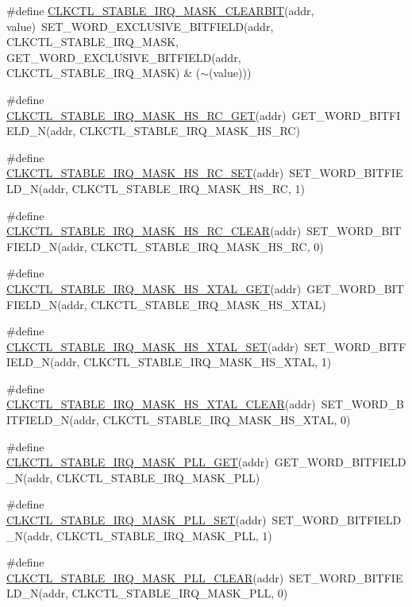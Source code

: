 \begin{DoxyCompactItemize}
\#define \hyperlink{a00544_a5a3fa9a6a8af8000278f7157d2a208f8}{CLKCTL\_\-STABLE\_\-IRQ\_\-MASK\_\-CLEARBIT}(addr, value)~SET\_\-WORD\_\-EXCLUSIVE\_\-BITFIELD(addr, CLKCTL\_\-STABLE\_\-IRQ\_\-MASK, GET\_\-WORD\_\-EXCLUSIVE\_\-BITFIELD(addr, CLKCTL\_\-STABLE\_\-IRQ\_\-MASK) \& ($\sim$(value)))
\item 
\#define \hyperlink{a00544_ad8c6920881a257497ed76a1f49bc9694}{CLKCTL\_\-STABLE\_\-IRQ\_\-MASK\_\-HS\_\-RC\_\-GET}(addr)~GET\_\-WORD\_\-BITFIELD\_\-N(addr, CLKCTL\_\-STABLE\_\-IRQ\_\-MASK\_\-HS\_\-RC)
\item 
\#define \hyperlink{a00544_afe28ba137916ddc3f9e1601464f5c461}{CLKCTL\_\-STABLE\_\-IRQ\_\-MASK\_\-HS\_\-RC\_\-SET}(addr)~SET\_\-WORD\_\-BITFIELD\_\-N(addr, CLKCTL\_\-STABLE\_\-IRQ\_\-MASK\_\-HS\_\-RC, 1)
\item 
\#define \hyperlink{a00544_a2ec47a0d33f2a91cbad1b54a4648a2de}{CLKCTL\_\-STABLE\_\-IRQ\_\-MASK\_\-HS\_\-RC\_\-CLEAR}(addr)~SET\_\-WORD\_\-BITFIELD\_\-N(addr, CLKCTL\_\-STABLE\_\-IRQ\_\-MASK\_\-HS\_\-RC, 0)
\item 
\#define \hyperlink{a00544_aa2ce7919f53613165c0fb6374e2bed16}{CLKCTL\_\-STABLE\_\-IRQ\_\-MASK\_\-HS\_\-XTAL\_\-GET}(addr)~GET\_\-WORD\_\-BITFIELD\_\-N(addr, CLKCTL\_\-STABLE\_\-IRQ\_\-MASK\_\-HS\_\-XTAL)
\item 
\#define \hyperlink{a00544_a5ec9404352f182506d2ca6e0a804d48a}{CLKCTL\_\-STABLE\_\-IRQ\_\-MASK\_\-HS\_\-XTAL\_\-SET}(addr)~SET\_\-WORD\_\-BITFIELD\_\-N(addr, CLKCTL\_\-STABLE\_\-IRQ\_\-MASK\_\-HS\_\-XTAL, 1)
\item 
\#define \hyperlink{a00544_a363edfa42eeb502ce43557ea6483296b}{CLKCTL\_\-STABLE\_\-IRQ\_\-MASK\_\-HS\_\-XTAL\_\-CLEAR}(addr)~SET\_\-WORD\_\-BITFIELD\_\-N(addr, CLKCTL\_\-STABLE\_\-IRQ\_\-MASK\_\-HS\_\-XTAL, 0)
\item 
\#define \hyperlink{a00544_ade4d749867ba0e90ac8f8ec09fcbfe96}{CLKCTL\_\-STABLE\_\-IRQ\_\-MASK\_\-PLL\_\-GET}(addr)~GET\_\-WORD\_\-BITFIELD\_\-N(addr, CLKCTL\_\-STABLE\_\-IRQ\_\-MASK\_\-PLL)
\item 
\#define \hyperlink{a00544_a07f3f9111a28596ff16d72684a56d444}{CLKCTL\_\-STABLE\_\-IRQ\_\-MASK\_\-PLL\_\-SET}(addr)~SET\_\-WORD\_\-BITFIELD\_\-N(addr, CLKCTL\_\-STABLE\_\-IRQ\_\-MASK\_\-PLL, 1)
\item 
\#define \hyperlink{a00544_a1f2813bfc86ec1af377ccfed4f068f0f}{CLKCTL\_\-STABLE\_\-IRQ\_\-MASK\_\-PLL\_\-CLEAR}(addr)~SET\_\-WORD\_\-BITFIELD\_\-N(addr, CLKCTL\_\-STABLE\_\-IRQ\_\-MASK\_\-PLL, 0)
\end{DoxyCompactItemize}



